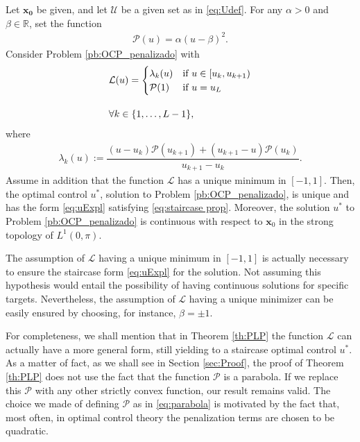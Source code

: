 \documentclass[twocolumn]{autart}    %
\begin{document}
\vspace{1em}
\begin{theorem}\label{th:PLP}
Let $\bm{x_0}$ be given, and let $\mathcal{U}$ be a given set as in \eqref{eq:Udef}. For any $\alpha>0$ and $\beta\in \mathbb{R}$, set the function
\begin{align}\label{eq:parabola}
	\mathcal{P}(u) = \alpha (u-\beta)^2.
\end{align}
Consider Problem \ref{pb:OCP_penalizado} with 
\begin{align}\label{eq:PLP}
	&\mathcal{L}(u) = \begin{cases}
            \lambda_k(u) & \text{if }  u \in [u_k,u_{k+1}) \\ \mathcal{P}(1) & \text{if } u = u_{L} 
    \end{cases} 
	\\[10pt]
	&\notag \forall k \in \{1,\dots,L-1\}, 
\end{align}
where 
\begin{align}\label{eq:lambda k}
	\lambda_k(u):= \dfrac{ (u-u_k)\mathcal{P}(u_{k+1}) + (u_{k+1}- u) \mathcal{P}(u_k)}{u_{k+1} - u_k}.
\end{align}
Assume in addition that the function $\mathcal{L}$ has a unique minimum in $[-1,1]$. 
Then, the optimal control $u^\ast$, solution to Problem \ref{pb:OCP_penalizado}, is unique and has the form \eqref{eq:uExpl} satisfying \eqref{eq:staircase prop}.
Moreover, the solution $u^\ast$ to Problem \ref{pb:OCP_penalizado} is continuous with respect to $\bm{x}_0$ in the strong topology of $L^1(0,\pi)$.
\end{theorem}


The assumption of $\mathcal{L}$ having a unique minimum in $[-1,1]$ is actually necessary to ensure the staircase form \eqref{eq:uExpl} for the solution. 
Not assuming this hypothesis would entail the possibility of having continuous solutions for specific targets.
Nevertheless, the assumption of $\mathcal{L}$ having a unique minimizer can be easily ensured by choosing, for instance, $\beta=\pm 1$.

\medskip 

\begin{remark}
For completeness, we shall mention that in Theorem \ref{th:PLP} the function $\mathcal L$ can actually have a more general form, still yielding to a staircase optimal control $u^\ast$. As a matter of fact, as we shall see in Section \ref{sec:Proof}, the proof of Theorem \ref{th:PLP} does not use the fact that the function $\mathcal P$ is a parabola. If we replace this $\mathcal P$ with any other strictly convex function, our result remains valid. The choice we made of defining $\mathcal P$ as in \eqref{eq:parabola} is motivated by the fact that, most often, in optimal control theory the penalization terms are chosen to be quadratic.
\end{remark}
\end{document}
